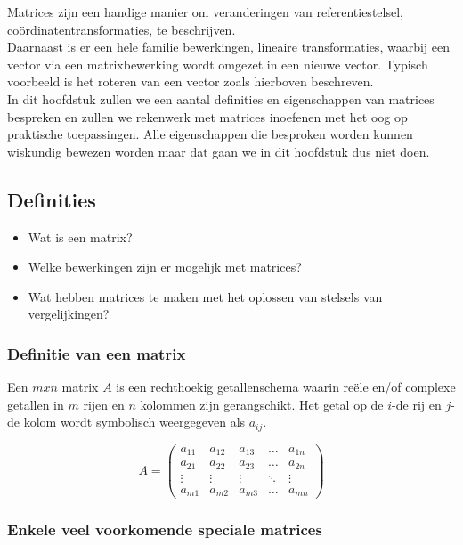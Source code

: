 Matrices zijn een handige manier om veranderingen van referentiestelsel, co\"{o}rdinatentransformaties, te beschrijven.\\
Daarnaast is er een hele familie bewerkingen, lineaire transformaties, waarbij een vector via een matrixbewerking wordt omgezet in een nieuwe vector. Typisch voorbeeld is het roteren van een vector zoals hierboven beschreven.\\

In dit hoofdstuk zullen we een aantal definities en eigenschappen van matrices bespreken en zullen we rekenwerk met matrices inoefenen met het oog op praktische toepassingen. Alle eigenschappen die besproken worden kunnen wiskundig bewezen worden maar dat gaan we in dit hoofdstuk dus niet doen.\\

\newpage

\subsection{Definities}

\begin{itemize}
	\item Wat is een matrix?
    \item Welke bewerkingen zijn er mogelijk met matrices?
    \item Wat hebben matrices te maken met het oplossen van stelsels van vergelijkingen?
\end{itemize}

\subsubsection{Definitie van een matrix}

Een $mxn$ matrix $A$ is een rechthoekig getallenschema waarin re\"{e}le en/of complexe getallen in $m$ rijen en $n$ kolommen zijn gerangschikt. Het getal op de $i$-de rij en $j$-de kolom wordt symbolisch weergegeven als $a_{ij}$.

\[
A= \left( \begin{matrix}
a_{11} & a_{12} & a_{13} & \ldots & a_{1n} \\
a_{21} & a_{22} & a_{23} & \ldots & a_{2n} \\
\vdots & \vdots & \vdots & \ddots & \vdots \\
a_{m1} & a_{m2} & a_{m3} & \ldots & a_{mn}
\end{matrix} \right)
\]

\subsubsection{Enkele veel voorkomende speciale matrices}

